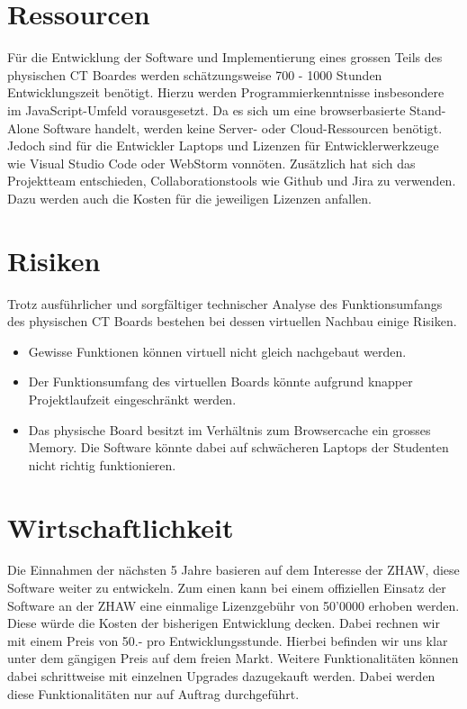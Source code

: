 \documentclass[10pt]{article}
\begin{document}
\section{Ressourcen}
Für die Entwicklung der Software und Implementierung eines grossen Teils des physischen CT Boardes werden schätzungsweise 700 - 1000 Stunden Entwicklungszeit benötigt. Hierzu werden Programmierkenntnisse insbesondere im JavaScript-Umfeld vorausgesetzt. Da es sich um eine browserbasierte Stand-Alone Software handelt, werden keine Server- oder Cloud-Ressourcen benötigt. Jedoch sind für die Entwickler Laptops und Lizenzen für Entwicklerwerkzeuge wie Visual Studio Code oder WebStorm vonnöten. Zusätzlich hat sich das Projektteam entschieden, Collaborationstools wie Github und Jira zu verwenden. Dazu werden auch die Kosten für die jeweiligen Lizenzen anfallen. 

\section{Risiken}
Trotz ausführlicher und sorgfältiger technischer Analyse des Funktionsumfangs des physischen CT Boards bestehen bei dessen virtuellen Nachbau einige Risiken. 
\begin{itemize}
\item Gewisse Funktionen können virtuell nicht gleich nachgebaut werden. 
\item Der Funktionsumfang des virtuellen Boards könnte aufgrund knapper Projektlaufzeit eingeschränkt werden. 
\item Das physische Board besitzt im Verhältnis zum Browsercache ein grosses Memory. Die Software könnte dabei auf schwächeren Laptops der Studenten nicht richtig funktionieren. 
\end{itemize}

\section{Wirtschaftlichkeit}
Die Einnahmen der nächsten 5 Jahre basieren auf dem Interesse der ZHAW, diese Software weiter zu entwickeln. Zum einen kann bei einem offiziellen Einsatz der Software an der ZHAW eine einmalige Lizenzgebühr von 50'0000 erhoben werden. Diese würde die Kosten der bisherigen Entwicklung decken. Dabei rechnen wir mit einem Preis von 50.- pro Entwicklungsstunde. Hierbei befinden wir uns klar unter dem gängigen Preis auf dem freien Markt. Weitere Funktionalitäten können dabei schrittweise mit einzelnen Upgrades dazugekauft werden. Dabei werden diese Funktionalitäten nur auf Auftrag durchgeführt.
\end{document}
